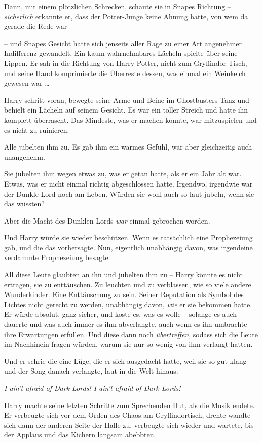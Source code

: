 Dann, mit einem plötzlichen Schrecken, schaute sie in Snapes Richtung –
\emph{sicherlich} erkannte er, dass der Potter-Junge keine Ahnung hatte, von wem
da gerade die Rede war –

– und Snapes Gesicht hatte sich jenseits aller Rage zu einer Art angenehmer
Indifferenz gewandelt. Ein kaum wahrnehmbares Lächeln spielte über seine Lippen.
Er sah in die Richtung von Harry Potter, nicht zum Gryffindor-Tisch, und seine
Hand komprimierte die Überreste dessen, was einmal ein Weinkelch gewesen war …

Harry schritt voran, bewegte seine Arme und Beine im Ghostbusters-Tanz und
behielt ein Lächeln auf seinem Gesicht. Es war ein toller Streich und hatte ihn
komplett überrascht. Das Mindeste, was er machen konnte, war mitzuspielen und es
nicht zu ruinieren.

Alle jubelten ihm zu. Es gab ihm ein warmes Gefühl, war aber gleichzeitig auch
unangenehm.

Sie jubelten ihm wegen etwas zu, was er getan hatte, als er ein Jahr alt war.
Etwas, was er nicht einmal richtig abgeschlossen hatte. Irgendwo, irgendwie war
der Dunkle Lord noch am Leben. Würden sie wohl auch so laut jubeln, wenn sie das
wüssten?

Aber die Macht des Dunklen Lords \emph{war} einmal gebrochen worden.

Und Harry würde sie wieder beschützen. Wenn es tatsächlich eine Prophezeiung
gab, und die das vorhersagte. Nun, eigentlich unabhängig davon, was irgendeine
verdammte Prophezeiung besagte.

All diese Leute glaubten an ihn und jubelten ihm zu – Harry könnte es nicht
ertragen, sie zu enttäuschen. Zu leuchten und zu verblassen, wie so viele andere
Wunderkinder. Eine Enttäuschung zu sein. Seiner Reputation als Symbol des
Lichtes nicht gerecht zu werden, unabhängig davon, \emph{wie} er sie bekommen
hatte. Er würde absolut, ganz sicher, und koste es, was es wolle – solange es
auch dauerte und was auch immer es ihm abverlangte, auch wenn es ihn umbrachte –
ihre Erwartungen erfüllen. Und diese dann noch \emph{übertreffen}, sodass sich
die Leute im Nachhinein fragen würden, warum sie nur so wenig von ihm verlangt
hatten.

Und er schrie die eine Lüge, die er sich ausgedacht hatte, weil sie so gut klang
und der Song danach verlangte, laut in die Welt hinaus:

\emph{I ain't afraid of Dark Lords! I ain't afraid of Dark Lords!}

Harry machte seine letzten Schritte zum Sprechenden Hut, als die Musik endete.
Er verbeugte sich vor dem Orden des Chaos am Gryffindortisch, drehte wandte sich
dann der anderen Seite der Halle zu, verbeugte sich wieder und wartete, bis der
Applaus und das Kichern langsam abebbten.

